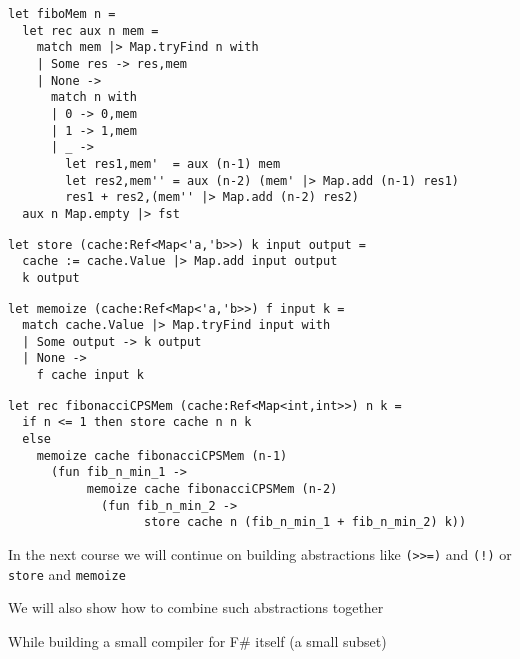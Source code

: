 \documentclass{beamer}
\begin{document}
\begin{frame}[fragile]
\begin{lstlisting}
let fiboMem n =
  let rec aux n mem =
    match mem |> Map.tryFind n with
    | Some res -> res,mem
    | None ->
      match n with
      | 0 -> 0,mem
      | 1 -> 1,mem
      | _ -> 
        let res1,mem'  = aux (n-1) mem
        let res2,mem'' = aux (n-2) (mem' |> Map.add (n-1) res1)
        res1 + res2,(mem'' |> Map.add (n-2) res2)
  aux n Map.empty |> fst
\end{lstlisting}
\end{frame}

\begin{frame}[fragile]
\begin{lstlisting}
let store (cache:Ref<Map<'a,'b>>) k input output =
  cache := cache.Value |> Map.add input output
  k output
\end{lstlisting}
\end{frame}

\begin{frame}[fragile]
\begin{lstlisting}
let memoize (cache:Ref<Map<'a,'b>>) f input k =
  match cache.Value |> Map.tryFind input with
  | Some output -> k output
  | None ->
    f cache input k
\end{lstlisting}
\end{frame}

\begin{frame}[fragile]
\begin{lstlisting}
let rec fibonacciCPSMem (cache:Ref<Map<int,int>>) n k = 
  if n <= 1 then store cache n n k
  else 
    memoize cache fibonacciCPSMem (n-1) 
      (fun fib_n_min_1 -> 
           memoize cache fibonacciCPSMem (n-2) 
             (fun fib_n_min_2 -> 
                   store cache n (fib_n_min_1 + fib_n_min_2) k))
\end{lstlisting}
\end{frame}


\begin{slide}{
\item In the next course we will continue on building abstractions like \texttt{(>>=)} and \texttt{(!)} or \texttt{store} and \texttt{memoize}
\item We will also show how to combine such abstractions together
\item While building a small compiler for F\# itself (a small subset)
}\end{slide}
\end{document}
